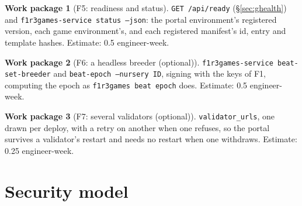\documentclass[11pt]{article}
\theoremstyle{definition}
\newtheorem{workpackage}{Work package}
\theoremstyle{remark}
\newcommand{\code}[1]{\texttt{#1}}
\begin{document}
\begin{workpackage}[F5: readiness and status]\label{wp:f5}
\code{GET /api/ready} (\S\ref{sec:ghealth}) and \code{f1r3games-service status
--json}: the portal environment's registered version, each game environment's, and
each registered manifest's id, entry and template hashes. Estimate: 0.5
engineer-week.
\end{workpackage}

\begin{workpackage}[F6: a headless breeder (optional)]\label{wp:f6}
\code{f1r3games-service beat-set-breeder} and \code{beat-epoch --nursery ID}, signing
with the keys of F1, computing the epoch as \code{f1r3games beat epoch} does.
Estimate: 0.5 engineer-week.
\end{workpackage}

\begin{workpackage}[F7: several validators (optional)]\label{wp:f7}
\code{validator\_urls}, one drawn per deploy, with a retry on another when one
refuses, so the portal survives a validator's restart and needs no restart when one
withdraws. Estimate: 0.25 engineer-week.
\end{workpackage}

\section{Security model}\label{sec:security}
\end{document}
